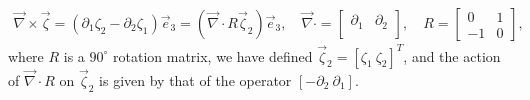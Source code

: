 \documentclass{cmslatex}
\begin{document}
\begin{align}\label{eq:Curl_2D}
  \vec{\nabla}\times\vec{\zeta}=(\partial_1\zeta_2-\partial_2\zeta_1)\vec{e}_3
%  
%  
  =(\vec{\nabla}\cdot R\vec{\zeta}_2)\vec{e}_3,
%
  \quad
%  
  \vec{\nabla}\cdot
    =\left[
    \begin{array}{ccc}
       \partial_1  &   \partial_2 \\      
    \end{array}
  \right],
  \quad
  R=
  \left[
    \begin{array}{rr}
        0  &  1  \\
       -1  &  0  
    \end{array}
  \right],
\end{align}
%
where $R$ is a $90^\circ$ rotation matrix, we have defined $\vec{\zeta}_2=[\zeta_1
\ \zeta_2]^T$, and the action of $\vec{\nabla}\cdot R$ on $\vec{\zeta}_2$ is given by that
of the operator $[ - \partial_2 \ \partial_1]$.
\end{document}
